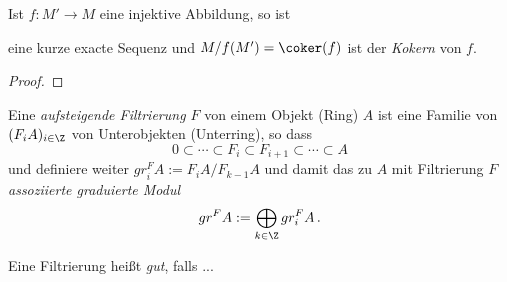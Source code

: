 \begin{prop}
Ist $f:M'\rightarrow M$ eine injektive Abbildung, so ist
\begin{center}
\end{center}
eine kurze exacte Sequenz und $M/f(M')=\coker(f)$ ist der \emph{Kokern} von
$f$.
\end{prop}
\begin{proof}
    
\end{proof}

\begin{defn}[Filtrierung] \label{defn:Filtrierung}
\cite[Def 10.13.1.]{stacks-project}
\cite[Rem 2.5.]{elliottDmod}
Eine \emph{aufsteigende Filtrierung $F$} von einem Objekt (Ring) $A$ ist eine
Familie von $(F_iA)_{i\in\Z}$ von Unterobjekten (Unterring), so dass 
\[ 0\subset\cdots\subset F_i\subset F_{i+1} \subset \cdots \subset A \]
und definiere weiter $gr_i^FA:=F_iA\slash F_{k-1}A$ und damit das zu $A$ mit
Filtrierung $F$ \emph{assoziierte graduierte Modul} 
\[gr^FA:=\bigoplus_{k\in\Z}gr_i^FA \,. \]
\begin{comment}
$gr_i^F$ als was??
\end{comment}
\end{defn}

\begin{defn}
\cite{ayoubIntro}
\cite[Def 3.2.1]{sabbah_cimpa90}
Eine Filtrierung heißt \emph{gut}, falls ...
\end{defn}


